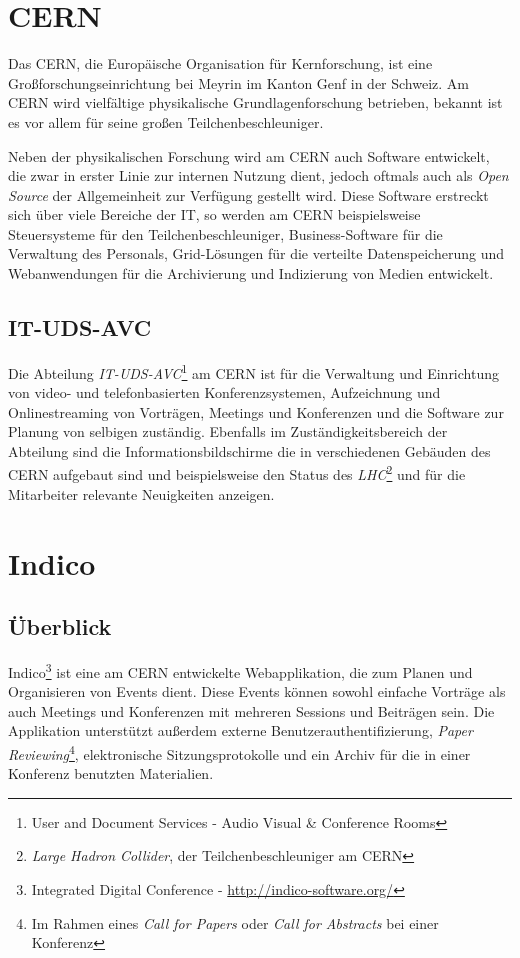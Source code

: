 \section{CERN}

Das CERN, die Europäische Organisation für Kernforschung, ist eine Großforschungseinrichtung bei
Meyrin im Kanton Genf in der Schweiz. Am CERN wird vielfältige physikalische Grundlagenforschung
betrieben, bekannt ist es vor allem für seine großen Teilchenbeschleuniger. \citep{wiki:cern}

Neben der physikalischen Forschung wird am CERN auch Software entwickelt, die zwar in erster Linie
zur internen Nutzung dient, jedoch oftmals auch als \emph{Open Source} der Allgemeinheit zur Verfügung
gestellt wird. Diese Software erstreckt sich über viele Bereiche der IT, so werden am CERN
beispielsweise Steuersysteme für den Teilchenbeschleuniger, Business-Software für die Verwaltung des
Personals, Grid-Lösungen für die verteilte Datenspeicherung und Webanwendungen für die Archivierung
und Indizierung von Medien entwickelt.

\subsection{IT-UDS-AVC}

Die Abteilung \emph{IT-UDS-AVC}\footnote{User and Document Services - Audio Visual \& Conference
Rooms} am CERN ist für die Verwaltung und Einrichtung von video- und telefonbasierten
Konferenzsystemen, Aufzeichnung und Onlinestreaming von Vorträgen, Meetings und Konferenzen und die
Software zur Planung von selbigen zuständig. Ebenfalls im Zuständigkeitsbereich der Abteilung sind
die Informationsbildschirme die in verschiedenen Gebäuden des CERN aufgebaut sind und beispielsweise
den Status des \emph{LHC}\footnote{\emph{Large Hadron Collider}, der Teilchenbeschleuniger am CERN} und
für die Mitarbeiter relevante Neuigkeiten anzeigen.


\section{Indico}

\subsection{Überblick}
Indico\footnote{Integrated Digital Conference - \href{http://indico-software.org/}{http://indico-software.org/}}
ist eine am CERN entwickelte Webapplikation, die zum Planen und Organisieren von Events dient. Diese
Events können sowohl einfache Vorträge als auch Meetings und Konferenzen mit mehreren Sessions und
Beiträgen sein. Die Applikation unterstützt außerdem externe Benutzerauthentifizierung, \emph{Paper
Reviewing}\footnote{Im Rahmen eines \emph{Call for Papers} oder \emph{Call for Abstracts} bei einer
Konferenz}, elektronische Sitzungsprotokolle und ein Archiv für die in einer Konferenz benutzten
Materialien. \citep{indico}

